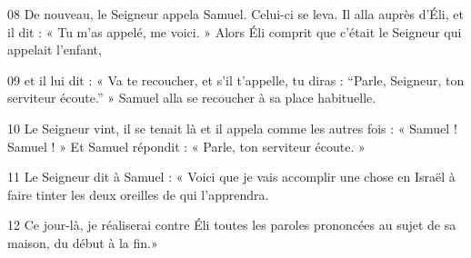 
08 De nouveau, le Seigneur appela Samuel. Celui-ci se leva. Il alla auprès d’Éli, et il dit : « Tu m’as appelé, me voici. » Alors Éli comprit que c’était le Seigneur qui appelait l’enfant,

09 et il lui dit : « Va te recoucher, et s’il t’appelle, tu diras : “Parle, Seigneur, ton serviteur écoute.” » Samuel alla se recoucher à sa place habituelle.

10 Le Seigneur vint, il se tenait là et il appela comme les autres fois : « Samuel ! Samuel ! » Et Samuel répondit : « Parle, ton serviteur écoute. »

11 Le Seigneur dit à Samuel : « Voici que je vais accomplir une chose en Israël à faire tinter les deux oreilles de qui l’apprendra.

12 Ce jour-là, je réaliserai contre Éli toutes les paroles prononcées au sujet de sa maison, du début à la fin.»
